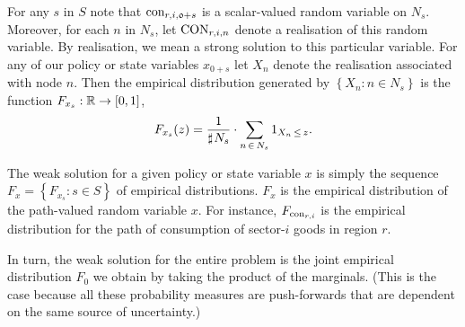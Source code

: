 \documentclass[12pt,a4paper,twoside, draft]{article}
\newcommand{\countof}{\mathbin{\sharp}\hskip1pt}
\begin{document}
For any $s$ in $S$ note that $\textup{con}_{r, i, \mathfrak{0} + s}$ is a
scalar-valued random variable on $N_s$. 
Moreover, for each $n$ in $N_s$, let $\textup{CON}_{r, i, n}$ denote a
realisation of this random variable.
By realisation, we mean a strong solution to this particular variable.
For any of our policy or state variables $x_{\mathfrak{0}+s}$ let $X_n$ denote
the realisation associated with node $n$.
Then the empirical distribution generated by $\left\{X_n: n \in N_s\right\}$ is
the function
$F_{x_{s}} : \mathbb R \rightarrow [0, 1]$,
\begin{equation}\label{eq-empirical-dbn}
   F_{x_s}(z) = \frac{1}{\countof N_{s}}
   \cdot \sum_{n \,\in\, N_{s}} 1_{X_n \,\leq\, z}.
\end{equation}

The weak solution for a given policy or state variable $x$ is simply the
sequence $F_{x} = \left\{F_{x_{s}}: s \in S\right\}$ of empirical distributions.
$F_{x}$ is the empirical distribution of the path-valued random variable $x$.
For instance, $F_{\textup{con}_{r, i}}$ is the empirical distribution for the
path of consumption of sector-$i$ goods in region $r$.

In turn, the weak solution for the entire problem is the joint empirical
distribution $F_{\mathfrak{0}}$ we obtain by taking the product of the
marginals.
(This is the case because all these probability measures are push-forwards that
are dependent on the same source of uncertainty.)
\end{document}

